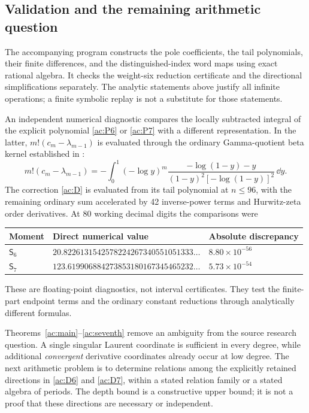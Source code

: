 \subsection{Validation and the remaining arithmetic question}

The accompanying program constructs the pole coefficients, the
tail polynomials, their finite differences, and the distinguished-index
word maps using exact rational algebra. It checks the weight-six
reduction certificate and the directional simplifications separately.
The analytic statements above justify all infinite operations; a
finite symbolic replay is not a substitute for those statements.

An independent numerical diagnostic compares the locally subtracted
integral of the explicit polynomial \eqref{ac:P6} or
\eqref{ac:P7} with a different representation. In the latter,
$m!(c_m-\lambda_{m-1})$ is evaluated through the ordinary
Gamma-quotient beta kernel established in \cite{Fifth}:
\begin{equation}\label{ac:diagnostic-kernel}
 m!(c_m-\lambda_{m-1})
 =-\int_0^1(-\log y)^m
  \frac{-\log(1-y)-y}{(1-y)^2[-\log(1-y)]^2}\,\dd y.
\end{equation}
The correction \eqref{ac:D} is evaluated from its tail polynomial
at $n\le96$, with the remaining ordinary sum accelerated by
42 inverse-power terms and Hurwitz-zeta order derivatives.
At 80 working decimal digits the comparisons were
\begin{center}
\small
\begin{tabular}{lll}
\hline
Moment & Direct numerical value & Absolute discrepancy\\
\hline
$\mathsf S_6$ & $20.8226131542578224267340551051333\ldots$
 & $8.80\times10^{-56}$\\
$\mathsf S_7$ & $123.619906884273853180167345465232\ldots$
 & $5.73\times10^{-54}$\\
\hline
\end{tabular}
\end{center}
These are floating-point diagnostics, not interval certificates.
They test the finite-part endpoint terms and the ordinary constant
reductions through analytically different formulas.

Theorems~\ref{ac:main}--\ref{ac:seventh} remove an ambiguity from
the source research question. A single singular Laurent coordinate
is sufficient in every degree, while additional \emph{convergent}
derivative coordinates already occur at low degree. The next
arithmetic problem is to determine relations among the explicitly
retained directions in \eqref{ac:D6} and \eqref{ac:D7}, within a
stated relation family or a stated algebra of periods. The depth
bound is a constructive upper bound; it is not a proof that these
directions are necessary or independent.
